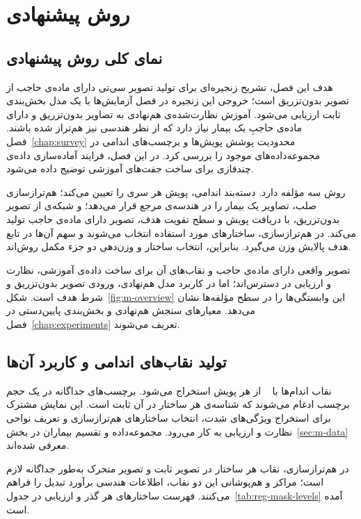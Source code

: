 \chapter{روش پیشنهادی}
\label{chap:method}

\section{نمای کلی روش پیشنهادی}
\label{sec:m-overview}

هدف این فصل، تشریح زنجیره‌ای برای تولید تصویر سی‌تی دارای ماده‌ی حاجب از تصویر بدون‌تزریق است؛ خروجی این زنجیره در فصل آزمایش‌ها با یک مدل بخش‌بندی ثابت ارزیابی می‌شود. آموزش نظارت‌شده‌ی هم‌نهادی به تصاویر بدون‌تزریق و دارای ماده‌ی حاجبِ یک بیمار نیاز دارد که از نظر هندسی نیز هم‌تراز شده باشند. فصل~\ref{chap:survey} محدودیت پوشش پویش‌ها و برچسب‌های اندامی در مجموعه‌داده‌های موجود را بررسی کرد. در این فصل، فرایند آماده‌سازی داده‌ی چندفازی برای ساخت جفت‌های آموزشی توضیح داده می‌شود.

روش سه مؤلفه دارد. دسته‌بند اندامی، پویش هر سری را تعیین می‌کند؛ هم‌ترازسازی صلب، تصاویر یک بیمار را در هندسه‌ی مرجع قرار می‌دهد؛ و شبکه‌ی  از تصویر بدون‌تزریق، با دریافت پویش و سطح تقویت هدف، تصویر دارای ماده‌ی حاجب تولید می‌کند. در هم‌ترازسازی، ساختارهای مورد استفاده انتخاب می‌شوند و سهم آن‌ها در تابع هدف پالایش وزن می‌گیرد. بنابراین، انتخاب ساختار و وزن‌دهی دو جزء مکمل روش‌اند.

تصویر واقعی دارای ماده‌ی حاجب و نقاب‌های آن برای ساخت داده‌ی آموزشی، نظارت و ارزیابی در دسترس‌اند؛ اما در کاربرد مدل هم‌نهادی، ورودی تصویر بدون‌تزریق و شرط هدف است. شکل~\ref{fig:m-overview} این وابستگی‌ها را در سطح مؤلفه‌ها نشان می‌دهد. معیارهای سنجش هم‌نهادی و بخش‌بندی پایین‌دستی در فصل~\ref{chap:experiments} تعریف می‌شوند.



\section{تولید نقاب‌های اندامی و کاربرد آن‌ها}
\label{sec:m-masks}

نقاب اندام‌ها با ~\cite{wasserthal2023} از هر پویش استخراج می‌شود. برچسب‌های جداگانه در یک حجم برچسب ادغام می‌شوند که شناسه‌ی هر ساختار در آن ثابت است. این نمایش مشترک برای استخراج ویژگی‌های شدت، انتخاب ساختارهای هم‌ترازسازی و تعریف نواحی نظارت و ارزیابی به کار می‌رود. مجموعه‌داده و تقسیم بیماران در بخش~\ref{sec:m-data} معرفی شده‌اند.

در هم‌ترازسازی، نقاب هر ساختار در تصویر ثابت و تصویر متحرک به‌طور جداگانه لازم است؛ مراکز و هم‌پوشانی این دو نقاب، اطلاعات هندسی برآورد تبدیل را فراهم می‌کنند. فهرست ساختارهای هر گذر و ارزیابی در جدول~\ref{tab:reg-mask-levels} آمده است.

